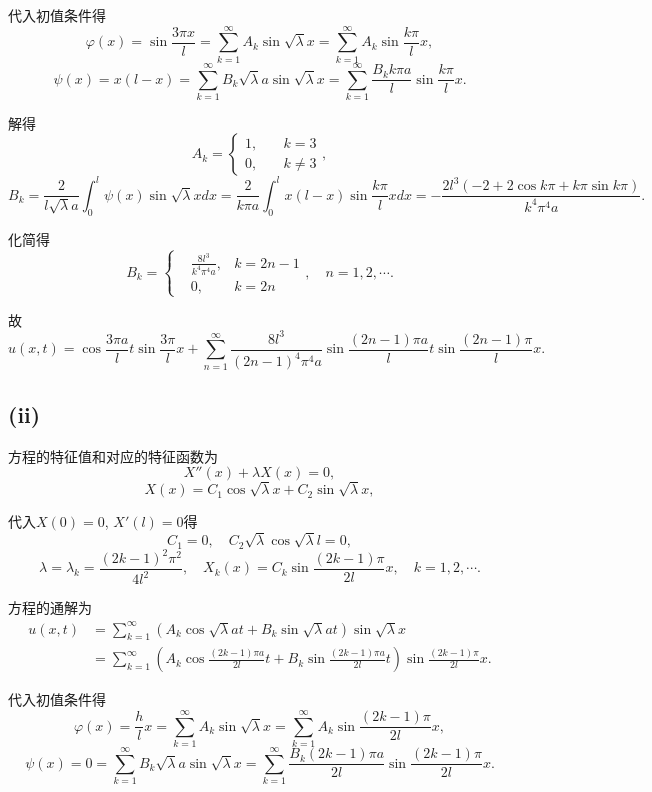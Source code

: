 \documentclass[11pt,a4paper]{article}
\begin{document}
代入初值条件得
$$\varphi(x)=\sin\frac{3\pi x}{l}=\sum_{k=1}^\infty A_k\sin\sqrt{\lambda}x=\sum_{k=1}^\infty A_k\sin\frac{k\pi }{l}x,$$
$$\psi(x)=x(l-x)=\sum_{k=1}^\infty B_k\sqrt{\lambda}a\sin\sqrt{\lambda}x=\sum_{k=1}^\infty \frac{B_kk\pi a}{l}\sin\frac{k\pi}{l}x.$$

解得
$$A_k=\left\{\begin{aligned}1, &\quad k = 3 \\ 0, &\quad k\neq 3 \end{aligned}\right.,$$
$$B_k=\frac{2}{l\sqrt{\lambda}a}\int_0^l\psi(x)\sin\sqrt{\lambda}xdx=
  \frac{2}{k\pi a}\int_0^l x(l-x)\sin\frac{k\pi}{l}xdx=-\frac{2l^3(-2+2\cos k\pi+k\pi\sin k\pi)}{k^4\pi^4a}.$$

化简得
$$B_k=\left\{\begin{aligned}&\frac{8l^3}{k^4\pi^4a}, & k = 2n-1 \\ &0, & k=2n \end{aligned}\right.,\quad n=1,2,\cdots.$$

故
$$u(x,t)=\cos\frac{3\pi a}{l}t\sin\frac{3\pi}{l}x+\sum_{n=1}^\infty\frac{8l^3}{(2n-1)^4\pi^4a}\sin\frac{(2n-1)\pi a}{l}t\sin\frac{(2n-1)\pi}{l}x.$$

\subsection*{(ii)}

方程的特征值和对应的特征函数为
$$X''(x)+\lambda X(x)=0,$$
$$X(x)=C_1\cos\sqrt{\lambda}x+C_2\sin\sqrt{\lambda}x,$$

代入$X(0)=0$, $X'(l)=0$得
$$C_1=0,\quad C_2\sqrt{\lambda}\cos\sqrt{\lambda}l=0,$$
$$\lambda=\lambda_k=\frac{(2k-1)^2\pi^2}{4l^2},\quad X_k(x)=C_k\sin\frac{(2k-1)\pi}{2l}x,\quad k=1,2,\cdots.$$

方程的通解为
\begin{align*}
  u(x,t)
   & =\sum_{k=1}^\infty\left(A_k\cos\sqrt{\lambda}at+
  B_k\sin\sqrt{\lambda}at\right)\sin\sqrt{\lambda}x          \\
   & =\sum_{k=1}^\infty\left(A_k\cos\frac{(2k-1)\pi a}{2l}t+
  B_k\sin\frac{(2k-1)\pi a}{2l}t\right)\sin\frac{(2k-1)\pi}{2l}x.
\end{align*}

代入初值条件得
$$\varphi(x)=\frac{h}{l}x=\sum_{k=1}^\infty A_k\sin\sqrt{\lambda}x=\sum_{k=1}^\infty A_k\sin\frac{(2k-1)\pi }{2l}x,$$
$$\psi(x)=0=\sum_{k=1}^\infty B_k\sqrt{\lambda}a\sin\sqrt{\lambda}x=\sum_{k=1}^\infty \frac{B_k(2k-1)\pi a}{2l}\sin\frac{(2k-1)\pi}{2l}x.$$
\end{document}
